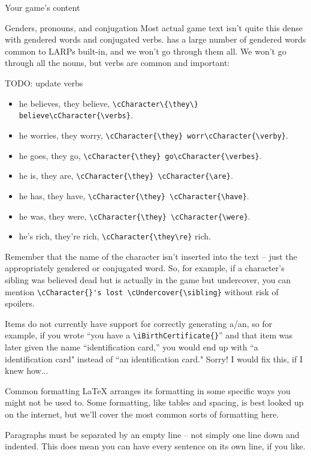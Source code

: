 \documentclass{article}
\begin{document}
\begin{section}{Your game's content}
\begin{subsection}{Genders, pronouns, and conjugation}
Most actual game text isn't quite this dense with gendered words and conjugated verbs.  \gametex{} has a large number of gendered words common to LARPs built-in, and we won't go through them all.  We won't go through all the nouns, but verbs are common and important:


TODO: update verbs
\begin{itemize}
\item he believes, they believe, \lstinline|\cCharacter\{\they\} believe\cCharacter{\verbs}|.
\item he worries, they worry, \lstinline|\cCharacter{\they} worr\cCharacter{\verby}|.
\item he goes, they go, \lstinline|\cCharacter{\they} go\cCharacter{\verbes}|.
\item he is, they are, \lstinline|\cCharacter{\they} \cCharacter{\are}|.
\item he has, they have, \lstinline|\cCharacter{\they} \cCharacter{\have}|.
\item he was, they were, \lstinline|\cCharacter{\they} \cCharacter{\were}|.
\item he's rich, they're rich, \lstinline|\cCharacter{\they\re}| rich.
\end{itemize}

Remember that the name of the character isn't inserted into the text – just the appropriately gendered or conjugated word.  So, for example, if a character's sibling was believed dead but is actually in the game but undercover, you can mention \lstinline|\cCharacter{}'s lost \cUndercover{\sibling}| without risk of spoilers.

Items do not currently have support for correctly generating a/an, so for example, if you wrote ``you have a \lstinline|\iBirthCertificate{}|'' and that item was later given the name ``identification card,'' you would end up with ``a identification card" instead of ``an identification card." Sorry!  I would fix this, if I knew how...
\end{subsection}
\begin{subsection}{Common formatting}
LaTeX arranges its formatting in some specific ways you might not be used to.  Some formatting, like tables and spacing, is best looked up on the internet, but we'll cover the most common sorts of formatting here.

Paragraphs must be separated by an empty line – not simply one line down and indented.  This does mean you can have every sentence on its own line, if you like.  


\end{subsection}
\end{section}
\end{document}
